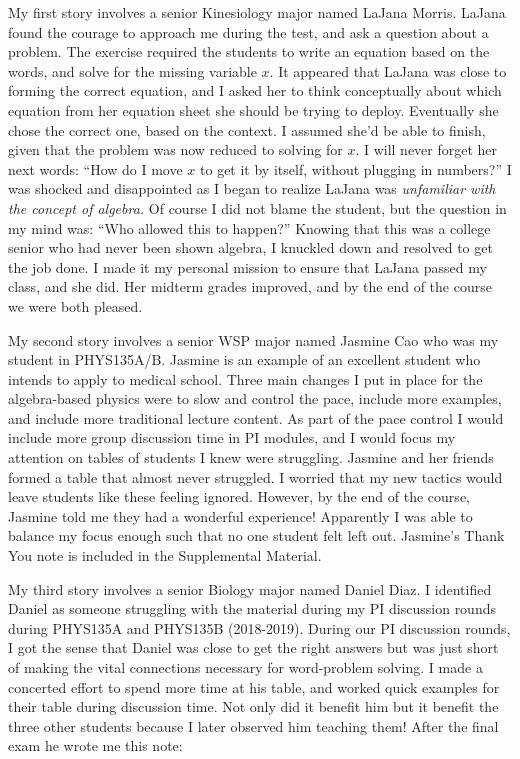 \documentclass[../../main.tex]{subfiles}
\begin{document}
My first story involves a senior Kinesiology major named LaJana Morris.  LaJana found the courage to approach me during the test, and ask a question about a problem.  The exercise required the students to write an equation based on the words, and solve for the missing variable $x$.  It appeared that LaJana was close to forming the correct equation, and I asked her to think conceptually about which equation from her equation sheet she should be trying to deploy.  Eventually she chose the correct one, based on the context.  I assumed she'd be able to finish, given that the problem was now reduced to solving for $x$.  I will never forget her next words: ``How do I move $x$ to get it by itself, without plugging in numbers?''  I was shocked and disappointed as I began to realize LaJana was \textit{unfamiliar with the concept of algebra.}  Of course I did not blame the student, but the question in my mind was: ``Who allowed this to happen?''  Knowing that this was a college senior who had never been shown algebra, I knuckled down and resolved to get the job done.  I made it my personal mission to ensure that LaJana passed my class, and she did.  Her midterm grades improved, and by the end of the course we were both pleased.  \\ \hspace{0.1cm}

My second story involves a senior WSP major named Jasmine Cao who was my student in PHYS135A/B.  Jasmine is an example of an excellent student who intends to apply to medical school.  Three main changes I put in place for the algebra-based physics were to slow and control the pace, include more examples, and include more traditional lecture content.  As part of the pace control I would include more group discussion time in PI modules, and I would focus my attention on tables of students I knew were struggling.  Jasmine and her friends formed a table that almost never struggled.  I worried that my new tactics would leave students like these feeling ignored.  However, by the end of the course, Jasmine told me they had a wonderful experience!  Apparently I was able to balance my focus enough such that no one student felt left out.  Jasmine's Thank You note is included in the Supplemental Material.  \\ \hspace{0.1cm}

My third story involves a senior Biology major named Daniel Diaz.  I identified Daniel as someone struggling with the material during my PI discussion rounds during PHYS135A and PHYS135B (2018-2019).  During our PI discussion rounds, I got the sense that Daniel was close to get the right answers but was just short of making the vital connections necessary for word-problem solving.  I made a concerted effort to spend more time at his table, and worked quick examples for their table during discussion time.  Not only did it benefit him but it benefit the three other students because I later observed him teaching them!  After the final exam he wrote me this note: \\ \hspace{0.1cm}
\end{document}
